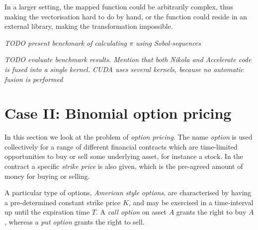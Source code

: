 \documentclass{llncs2e/llncs}
\begin{document}
In a larger setting, the mapped function could be arbitrarily complex,
thus making the vectorisation hard to do by hand, or the function could
reside in an external library, making the transformation impossible.


\emph{TODO present benchmark of calculating $\pi$ using Sobol-sequences}

\emph{TODO evaluate benchmark results. Mention that both Nikola and
  Accelerate code is fused into a single kernel. CUDA uses several
  kernels, because no automatic fusion is performed}


\section{Case II: Binomial option pricing}
In this section we look at the problem of \emph{option pricing}. The
name \emph{option} is used collectively for a range of different
financial contracts which are time-limited opportunities to buy or
sell some underlying asset, for instance a stock. In the contract a
specific \emph{strike price} is also given, which is the pre-agreed
amount of money for buying or selling.

A particular type of options, \emph{American style options}, are
characterised by having a pre-determined constant strike price $K$,
and may be exercised in a time-interval up until the expiration time
$T$. A \emph{call option} on asset $A$ grants the right to buy $A$,
whereas a \emph{put option} grants the right to sell.
\end{document}
